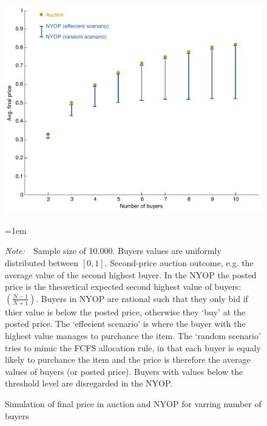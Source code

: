 \documentclass[a4paper,12pt]{article}
\newcommand{\Figtext}[1]{%
	\begin{tablenotes}[para,flushleft]
		\hangindent=1em
		\footnotesize
		\raggedright
		#1
	\end{tablenotes}
}
\newcommand{\Fignote}[1]{\Figtext{\emph{Note:~}~#1}}
\begin{document}
	\begin{figure}
	        \centering
	        \caption{Simulation of final price in auction and NYOP for varring number of buyers}
	        \includegraphics[width=\textwidth]{Figures/FinalPrice_Auction-NYOP}
			\label{fig:FinalPrice_Auction-NYOP}
			\Fignote{Sample size of 10.000. Buyers values are uniformly distributed between $[0,1]$. Second-price auction outcome, e.g. the average value of the second highest buyer. In the NYOP the posted price is the theoretical expected second highest value of buyers: $(\frac{N-1}{N+1})$. Buyers in NYOP are rational such that they only bid if thier value is below the posted price, otherwise they `buy' at the posted price. The `effecient scenario' is where the buyer with the highest value manages to purchance the item. The `random scenario' tries to mimic the FCFS allocation rule, in that each buyer is equaly likely to purchance the item and the price is therefore the average values of buyers (or posted price). Buyers with values below the threshold level are disregarded in the NYOP.}
	\end{figure}
\end{document}

